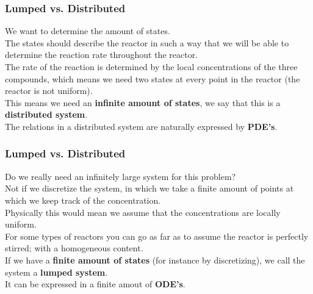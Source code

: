\documentclass{beamer}
\begin{document}

\begin{frame}
\frametitle{Lumped vs. Distributed}
\vspace{-6ex}
We want to determine the amount of states.\\
\medskip
The states should describe the reactor in such a way that we will be able to determine the reaction rate throughout the reactor.\\
\medskip
The rate of the reaction is determined by the local concentrations of the three compounds, which means we need two states at every point in the reactor (the reactor is not uniform).\\
\medskip
This means we need an \textbf{infinite amount of states}, we say that this is a \textbf{distributed system}.\\
\medskip
The relations in a distributed system are naturally expressed by \textbf{PDE's}.
\end{frame}


\begin{frame}
\frametitle{Lumped vs. Distributed}
\vspace{-6ex}
Do we really need an infinitely large system for this problem?\\
\medskip
Not if we discretize the system, in which we take a finite amount of points at which we keep track of the concentration.\\
\medskip
Physically this would mean we assume that the concentrations are locally uniform.\\
\medskip
For some types of reactors you can go as far as to assume the reactor is perfectly stirred; with a homogeneous content.\\
\medskip
If we have a \textbf{finite amount of states} (for instance by discretizing), we call the system a \textbf{lumped system}.\\
\medskip
It can be expressed in a finite amout of \textbf{ODE's}.
\end{frame}

\end{document}
